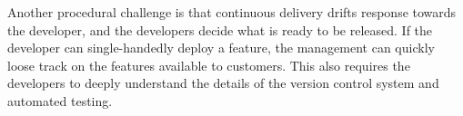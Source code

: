 \documentclass[english]{tktltiki2}
\theoremstyle{definition}
\theoremstyle{remark}
\begin{document}

Another procedural challenge is that continuous delivery drifts response towards the developer, and the developers decide what is ready to be released. If the developer can single-handedly deploy a feature, the management can quickly loose track on the features available to customers. This also requires the developers to deeply understand the details of the version control system and automated testing. 




\end{document}
